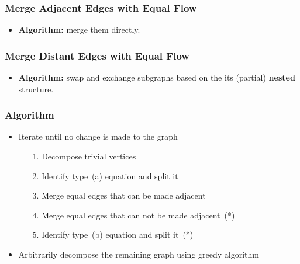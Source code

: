 \frame
{
	\frametitle{Merge Adjacent Edges with Equal Flow}
	\vspace{-2.0cm}

	\begin{itemize}
	\item {\bf Algorithm:} merge them directly.
	\end{itemize}

	\vspace{0.8cm}
	

}


\frame
{
	\frametitle{Merge Distant Edges with Equal Flow}
	\vspace{-3.0cm}

	\begin{itemize}
	\item {\bf Algorithm:} swap and exchange subgraphs based on the its (partial) {\bf nested} structure.
	\end{itemize}

	\vspace{0.8cm}
	

}

\frame
{
	\frametitle{Algorithm}
	\begin{itemize}
	\item Iterate until no change is made to the graph
		\vspace{0.2cm}
		\begin{itemize}
		\item[1.] Decompose trivial vertices
		\vspace{0.2cm}
		\item[2.] Identify type~(a) equation and split it
		\vspace{0.2cm}
		\item[3.] Merge equal edges that can be made adjacent
		\vspace{0.2cm}
		\item[4.] Merge equal edges that can not be made adjacent~(*)
		\vspace{0.2cm}
		\item[5.] Identify type~(b) equation and split it~(*)
		\vspace{0.2cm}
		\end{itemize}
	\item Arbitrarily decompose the remaining graph using greedy algorithm
	\end{itemize}
}
